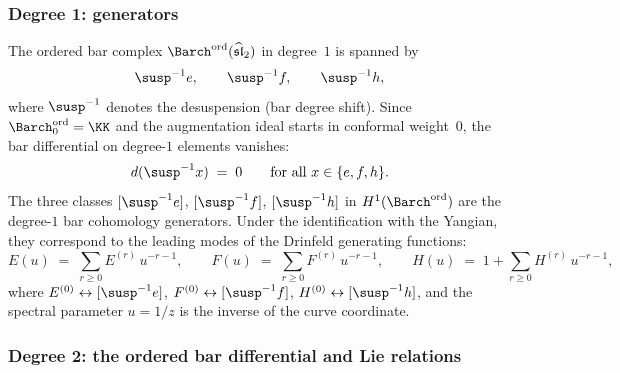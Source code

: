 \subsubsection*{Degree 1: generators}

The ordered bar complex ${\Barch}^{\mathrm{ord}}(\widehat{\mathfrak{sl}}_2)$
in degree~$1$ is spanned by
\[
\susp^{-1}e,\qquad \susp^{-1}f,\qquad \susp^{-1}h,
\]
where $\susp^{-1}$ denotes the desuspension (bar degree shift). Since
${\Barch}^{\mathrm{ord}}_0=\KK$ and the augmentation ideal starts in
conformal weight~$0$, the bar differential on degree-$1$ elements
vanishes:
\[
d(\susp^{-1}x)\;=\;0\qquad\text{for all }x\in\{e,f,h\}.
\]
The three classes $[\susp^{-1}e]$, $[\susp^{-1}f]$, $[\susp^{-1}h]$ in
$H^1({\Barch}^{\mathrm{ord}})$ are the degree-$1$ bar cohomology generators.
Under the identification with the Yangian, they correspond to the
leading modes of the Drinfeld generating functions:
\[
E(u)\;=\;\sum_{r\ge 0}E^{(r)}\,u^{-r-1},\qquad
F(u)\;=\;\sum_{r\ge 0}F^{(r)}\,u^{-r-1},\qquad
H(u)\;=\;1+\sum_{r\ge 0}H^{(r)}\,u^{-r-1},
\]
where $E^{(0)}\leftrightarrow [\susp^{-1}e]$,
$F^{(0)}\leftrightarrow [\susp^{-1}f]$,
$H^{(0)}\leftrightarrow [\susp^{-1}h]$, and the spectral parameter
$u=1/z$ is the inverse of the curve coordinate.

\subsubsection*{Degree 2: the ordered bar differential and Lie relations}

